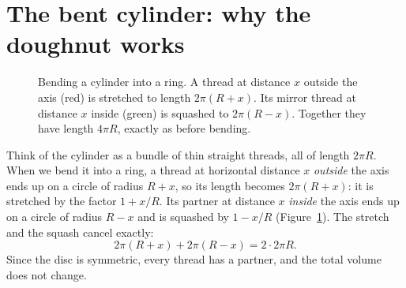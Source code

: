 \documentclass[11pt]{article}
\theoremstyle{plain}
\theoremstyle{definition}
\theoremstyle{remark}
\begin{document}
\section{The bent cylinder: why the doughnut works}\label{sec:cylinder}

\begin{figure}[h]
\centering
{}
\caption{Bending a cylinder into a ring. A thread at distance $x$ outside the axis (red) is stretched to length $2\pi(R+x)$. Its mirror thread at distance $x$ inside (green) is squashed to $2\pi(R-x)$. Together they have length $4\pi R$, exactly as before bending.}
\label{fig:bend}
\end{figure}

Think of the cylinder as a bundle of thin straight threads, all of length $2\pi R$. When we bend it into a ring, a thread at horizontal distance $x$ \emph{outside} the axis ends up on a circle of radius $R+x$, so its length becomes $2\pi(R+x)$: it is stretched by the factor $1+x/R$. Its partner at distance $x$ \emph{inside} the axis ends up on a circle of radius $R-x$ and is squashed by $1-x/R$ (Figure~\ref{fig:bend}). The stretch and the squash cancel exactly:
\[
  2\pi(R+x) + 2\pi(R-x) = 2\cdot 2\pi R .
\]
Since the disc is symmetric, every thread has a partner, and the total volume does not change.
\end{document}
